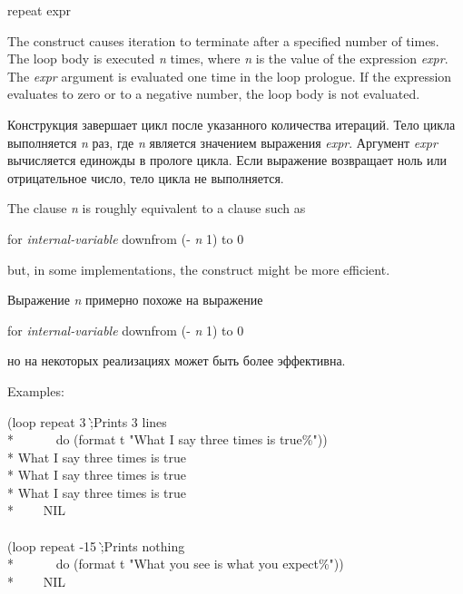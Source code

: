\begin{defloop}
repeat expr

The  construct causes iteration to terminate after a
specified number of times.
The loop body is executed \emph{n} times, where \emph{n} is the value 
of the expression \emph{expr}.  The \emph{expr} argument is evaluated one time
in the loop prologue.  If the expression evaluates to zero or 
to a negative number, the loop body is not evaluated.

Конструкция  завершает цикл после указанного количества
итераций.  Тело цикла выполняется \emph{n} раз, где \emph{n} является
значением выражения \emph{expr}. Аргумент \emph{expr} вычисляется
единожды в прологе цикла. Если выражение возвращает ноль или
отрицательное число, тело цикла не выполняется.

The clause  \emph{n} is roughly equivalent to a clause
such as
\begin{lisp}
for \emph{internal-variable} downfrom (- \emph{n} 1) to 0
\end{lisp}
but, in some implementations, the  construct might be more
efficient.

Выражение  \emph{n} примерно похоже на выражение
\begin{lisp}
for \emph{internal-variable} downfrom (- \emph{n} 1) to 0
\end{lisp}
но на некоторых реализациях  может быть более эффективна.

Examples:
\begin{lisp}
(loop repeat 3 \`;\textrm{Prints 3 lines}\\*
~~~~~~do (format t "What I say three times is true{\Xtilde}\%")) \\*
What I say three times is true \\*
What I say three times is true \\*
What I say three times is true \\*
~~~\EV~NIL \\
 \\
(loop repeat -15 \`;\textrm{Prints nothing}\\*
~~~~~~do (format t "What you see is what you expect{\Xtilde}\%")) \\*
~~~\EV~NIL
\end{lisp}


\end{defloop}
